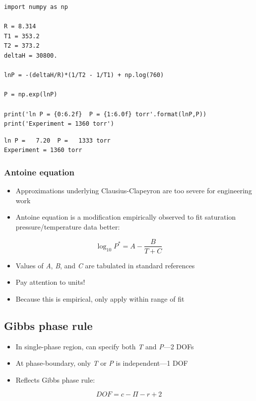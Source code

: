 \documentclass[11pt]{article}
\begin{document}
\begin{verbatim}
import numpy as np

R = 8.314
T1 = 353.2
T2 = 373.2
deltaH = 30800.

lnP = -(deltaH/R)*(1/T2 - 1/T1) + np.log(760)

P = np.exp(lnP)

print('ln P = {0:6.2f}  P = {1:6.0f} torr'.format(lnP,P))
print('Experiment = 1360 torr')
\end{verbatim}

\begin{verbatim}
ln P =   7.20  P =   1333 torr
Experiment = 1360 torr
\end{verbatim}

\subsubsection{Antoine equation}
\label{sec-8-1-2}
\begin{itemize}
\item Approximations underlying Clausius-Clapeyron are too severe for engineering work
\item Antoine equation is a modification empirically observed to fit saturation pressure/temperature data better:
\end{itemize}

\[ \log_{10}P^{*} = A - \frac{B}{T+C} \]

\begin{itemize}
\item Values of \emph{A}, \emph{B}, and \emph{C} are tabulated in standard references
\item Pay attention to units!
\item Because this is empirical, only apply within range of fit
\end{itemize}
\subsection{Gibbs phase rule}
\label{sec-8-2}
\begin{itemize}
\item In single-phase region, can specify both \emph{T} and \emph{P}---2 DOFs
\item At phase-boundary, only \emph{T} or \emph{P} is independent---1 DOF
\item Reflects Gibbs phase rule:
\end{itemize}

\[ DOF = c - \Pi - r + 2\]
\end{document}
